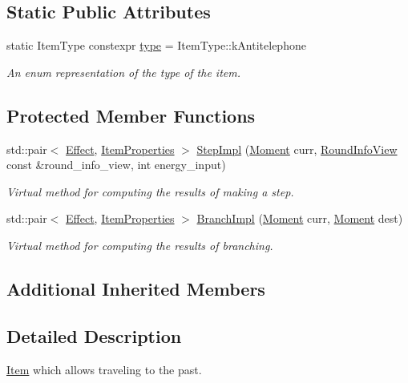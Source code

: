 \subsection*{Static Public Attributes}
\begin{DoxyCompactItemize}
\item 
static Item\+Type constexpr \hyperlink{classitem_1_1_antitelephone_ab6d34885da8ab27a578da87a0c746744}{type} = Item\+Type\+::k\+Antitelephone
\begin{DoxyCompactList}\small\item\em An enum representation of the type of the item. \end{DoxyCompactList}\end{DoxyCompactItemize}
\subsection*{Protected Member Functions}
\begin{DoxyCompactItemize}
\item 
std\+::pair$<$ \hyperlink{classitem_1_1_effect}{Effect}, \hyperlink{classitem_1_1_item_properties}{Item\+Properties} $>$ \hyperlink{classitem_1_1_antitelephone_aa59b4569bac948f37fd15dbea234503f}{Step\+Impl} (\hyperlink{classtimeplane_1_1_moment}{Moment} curr, \hyperlink{classroundinfo_1_1_round_info_view}{Round\+Info\+View} const \&round\+\_\+info\+\_\+view, int energy\+\_\+input)
\begin{DoxyCompactList}\small\item\em Virtual method for computing the results of making a step. \end{DoxyCompactList}\item 
std\+::pair$<$ \hyperlink{classitem_1_1_effect}{Effect}, \hyperlink{classitem_1_1_item_properties}{Item\+Properties} $>$ \hyperlink{classitem_1_1_antitelephone_a1b094baeb7cae7e1161d1aa1650022d1}{Branch\+Impl} (\hyperlink{classtimeplane_1_1_moment}{Moment} curr, \hyperlink{classtimeplane_1_1_moment}{Moment} dest)
\begin{DoxyCompactList}\small\item\em Virtual method for computing the results of branching. \end{DoxyCompactList}\end{DoxyCompactItemize}
\subsection*{Additional Inherited Members}


\subsection{Detailed Description}
\hyperlink{classitem_1_1_item}{Item} which allows traveling to the past. 


